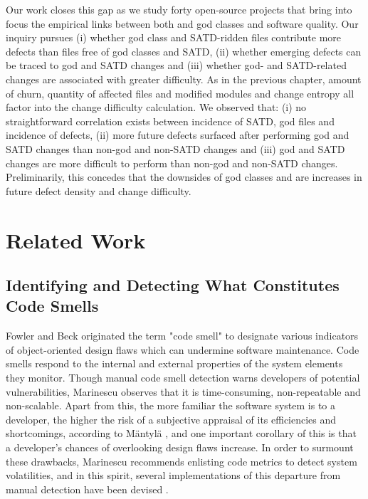 Our work closes this gap as we study forty open-source projects that bring into focus the empirical links between both \SATD and god classes and software quality. Our inquiry pursues (i) whether god class and SATD-ridden files contribute more defects than files free of god classes and SATD, (ii) whether emerging defects can be traced to god and SATD changes and (iii) whether god- and SATD-related changes are associated with greater difficulty. As in the previous chapter, amount of churn, quantity of affected files and modified modules and change entropy all factor into the change difficulty calculation. We observed that: (i) no straightforward correlation exists between incidence of SATD, god files and incidence of defects, (ii) more future defects surfaced after performing god and SATD changes than non-god and non-SATD changes and (iii) god and SATD changes are more difficult to perform than non-god and non-SATD changes. Preliminarily, this concedes that the downsides of god classes and \SATD are increases in future defect density and change difficulty.


\section{Related Work}
\label{chap4:sec:related_work}

\subsection{Identifying and Detecting What Constitutes Code Smells}
Fowler and Beck \cite{fowler1999refactoring} originated the term "code smell" to designate various indicators of object-oriented design flaws which can undermine software maintenance. Code smells respond to the internal and external properties of the system elements they monitor. Though manual code smell detection warns developers of potential vulnerabilities, Marinescu \cite{Marinescu_ICETOOLS} observes that it is time-consuming, non-repeatable and non-scalable. Apart from this, the more familiar the software system is to a developer, the higher the risk of a subjective appraisal of its efficiencies and shortcomings, according to Mäntylä \cite{mantyla2003taxonomy} \cite{mantyla2004bad}, and one important corollary of this is that a developer's chances of overlooking design flaws increase. In order to surmount these drawbacks, Marinescu recommends enlisting code metrics to detect system volatilities, and in this spirit, several implementations of this departure from manual detection have been devised \cite{marinescu2004detection} \cite{Marinescu_PhD} \cite{Marinescu_IBM_JRD} \cite{lanza2007object}.

